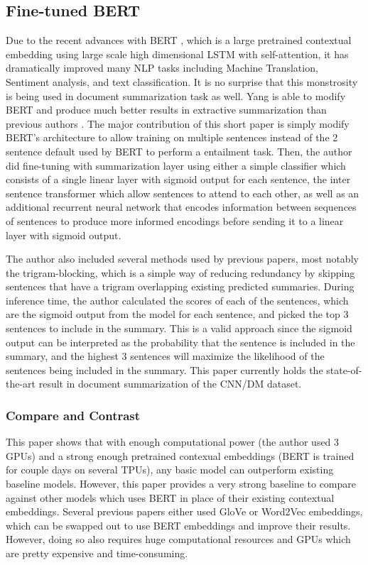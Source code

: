 \documentclass[11pt,a4paper]{article}
\begin{document}
\subsection{Fine-tuned BERT}
Due to the recent advances with BERT \cite{bert}, which is a large pretrained contextual embedding using large scale high dimensional LSTM with self-attention, it has dramatically improved many NLP tasks including Machine Translation, Sentiment analysis, and text classification. It is no surprise that this monstrosity is being used in document summarization task as well. Yang is able to modify BERT and produce much better results in extractive summarization than previous authors \cite{bert-sum}. The major contribution of this short paper is simply modify BERT's architecture to allow training on multiple sentences instead of the 2 sentence default used by BERT to perform a entailment task. Then, the author did fine-tuning with summarization layer using either a simple classifier which consists of a single linear layer with sigmoid output for each sentence, the inter sentence transformer which allow sentences to attend to each other, as well as an additional recurrent neural network that encodes information between sequences of sentences to produce more informed encodings before sending it to a linear layer with sigmoid output.

The author also included several methods used by previous papers, most notably the trigram-blocking, which is a simple way of reducing redundancy by skipping sentences that have a trigram overlapping existing predicted summaries. During inference time, the author calculated the scores of each of the sentences, which are the sigmoid output from the model for each sentence, and picked the top 3 sentences to include in the summary. This is a valid approach since the sigmoid output can be interpreted as the probability that the sentence is included in the summary, and the highest 3 sentences will maximize the likelihood of the sentences being included in the summary. This paper currently holds the state-of-the-art result in document summarization of the CNN/DM dataset.

\subsubsection{Compare and Contrast}
This paper shows that with enough computational power (the author used 3 GPUs) and a strong enough pretrained contexual embeddings (BERT is trained for couple days on several TPUs), any basic model can outperform existing baseline models. However, this paper provides a very strong baseline to compare against other models which uses BERT in place of their existing contextual embeddings. Several previous papers either used GloVe or Word2Vec embeddings, which can be swapped out to use BERT embeddings and improve their results. However, doing so also requires huge computational resources and GPUs which are pretty expensive and time-consuming.
\end{document}
